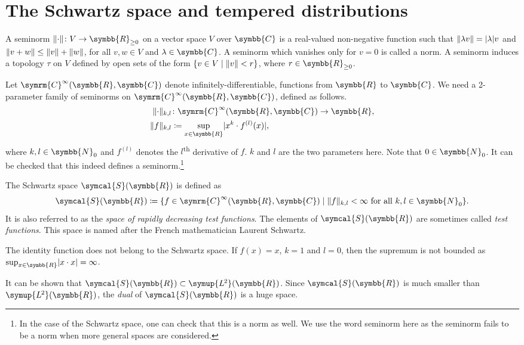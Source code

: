 \documentclass[12pt, a4 paper]{article}
\theoremstyle{definition}
\newcommand{\ltwo}{\symup{L\kern-0.5pt^2}}
\newcommand{\rr}{\symbb{R}}
\newcommand{\cc}{\symbb{C}}
\newcommand{\nn}{\symbb{N}_0}
\newcommand{\ltwor}{\ltwo(\rr)}
\newcommand{\schwartz}{\symcal{S}}
\newcommand{\schwartzr}{\schwartz(\rr)}
\newcommand{\cinfinity}{\symrm{C}^\infty}
\DeclarePairedDelimiter{\norm}{\lVert}{\rVert}
\DeclarePairedDelimiter{\abs}{\lvert}{\rvert}
\begin{document}
    \section{The Schwartz space and tempered distributions}

    A seminorm $\norm{\cdot} \colon V \rightarrow \rr_{\geq 0}$ on a vector space $V$ over $\cc$ is a real-valued non-negative function such that $\norm{\lambda v} = \abs{\lambda} v$ and $\norm{v + w} \leq \norm{v} + \norm{w}$, for all $v,w \in V$ and $\lambda \in \cc$. A seminorm which vanishes only for $v=0$ is called a norm. A seminorm induces a topology $\tau$ on $V$ defined by open sets of the form $\{v\in V \mid \norm{v} < r\}$, where $r \in \rr_{\geq 0}$.

    Let $\cinfinity(\rr, \cc)$ denote infinitely-differentiable, functions from $\rr$ to $\cc$. We need a 2-parameter family of seminorms on $\cinfinity(\rr, \cc)$, defined as follows.
    \begin{align*}
        \norm{\cdot}_{k,l} &\colon \cinfinity(\rr, \cc) \rightarrow \rr,\\
        \norm{f}_{k,l} &\coloneq \sup_{x \in \rr}\abs{x^k \cdot f^{(l)}(x)},
    \end{align*}
    where $k, l \in \nn$ and $f^{(l)}$ denotes the $l$\textsuperscript{th} derivative of $f$. $k$ and $l$ are the two parameters here. Note that $0 \in \nn$. It can be checked that this indeed defines a seminorm.\footnote{In the case of the Schwartz space, one can check that this is a norm as well. We use the word seminorm here as the seminorm fails to be a norm when more general spaces are considered.}

    The Schwartz space $\schwartzr$ is defined as
    \[
    \schwartzr \coloneq \{f \in \cinfinity(\rr, \cc) \mid \norm{f}_{k,l} < \infty \text{ for all } k, l \in \nn\}.
    \]
    It is also referred to as the \textit{space of rapidly decreasing test functions}. The elements of $\schwartzr$ are sometimes called \textit{test functions}. This space is named after the French mathematician Laurent Schwartz.

    The identity function does not belong to the Schwartz space. If $f(x) = x$, $k=1$ and $l=0$, then the supremum is not bounded as $\sup_{x \in \rr} \abs{x \cdot x} = \infty$.

    It can be shown that $\schwartzr \subset \ltwor$. Since $\schwartzr$ is much smaller than $\ltwor$, the \textit{dual} of $\schwartzr$ is a huge space.
\end{document}
